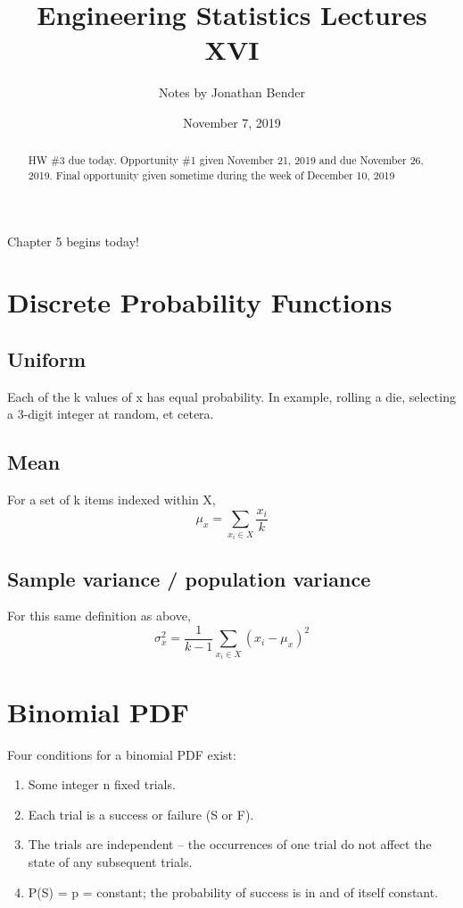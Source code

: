 \documentclass[]{article}
\title{Engineering Statistics Lectures XVI}
\author{Notes by Jonathan Bender}
\date{November 7, 2019}
\begin{document}
	
	\maketitle
	
	\begin{abstract}
		HW \#3 due today.
		Opportunity \#1 given November 21, 2019 and due November 26, 2019.
		Final opportunity given sometime during the week of December 10, 2019
	\end{abstract}

	Chapter 5 begins today!
	
	\section{Discrete Probability Functions}
		\subsection{Uniform}
			Each of the k values of x has equal probability. In example, rolling a die, selecting a 3-digit integer at random, et cetera.
		\subsection{Mean}
			For a set of k items indexed within X,
			$$\mu_x = \sum_{x_i \in X}\dfrac{x_i}{k}$$
		\subsection{Sample variance / population variance}
			For this same definition as above,
			$$\sigma_x^2 = \dfrac{1}{k-1}\sum_{x_i \in X}(x_i - \mu_x)^2$$
	
	\pagebreak
	\section{Binomial PDF}
		Four conditions for a binomial PDF exist:
		
		\begin{enumerate}
			\item Some integer n fixed trials.
			\item Each trial is a success or failure (S or F).
			\item The trials are independent -- the occurrences of one trial do not affect the state of any subsequent trials.
			\item P(S) = p = constant; the probability of success is in and of itself constant.
		\end{enumerate}
	
\end{document}
